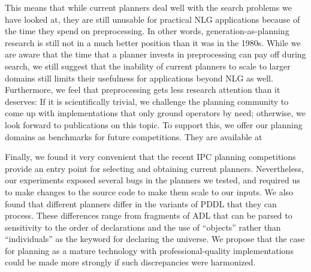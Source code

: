 This means that while current planners deal well with the search
problems we have looked at, they are still unusable for practical NLG
applications because of the time they spend on preprocessing. In other
words, generation-as-planning research is still not in a much better
position than it was in the 1980s. While we are aware that the time
that a planner invests in preprocessing can pay off during search, we
still suggest that the inability of current planners to scale to
larger domains still limits their usefulness for applications beyond
NLG as well. Furthermore, we feel that preprocessing gets less
research attention than it deserves: If it is scientifically trivial,
we challenge the planning community to come up with implementations
that only ground operators by need; otherwise, we look forward to
publications on this topic. To support this, we offer our planning
domains as benchmarks for future competitions. They are available at

Finally, we found it very convenient that the recent IPC planning
competitions provide an entry point for selecting and obtaining
current planners. Nevertheless, our experiments exposed several bugs
in the planners we tested, and required us to make changes to the
source code to make them scale to our inputs. We also found that
different planners differ in the variants of PDDL that they can
process. These differences range from fragments of ADL that can be
parsed to sensitivity to the order of declarations and the use of
``objects'' rather than ``individuals'' as the keyword for declaring
the universe. We propose that the case for planning as a mature
technology with professional-quality implementations could be made
more strongly if such discrepancies were harmonized.



